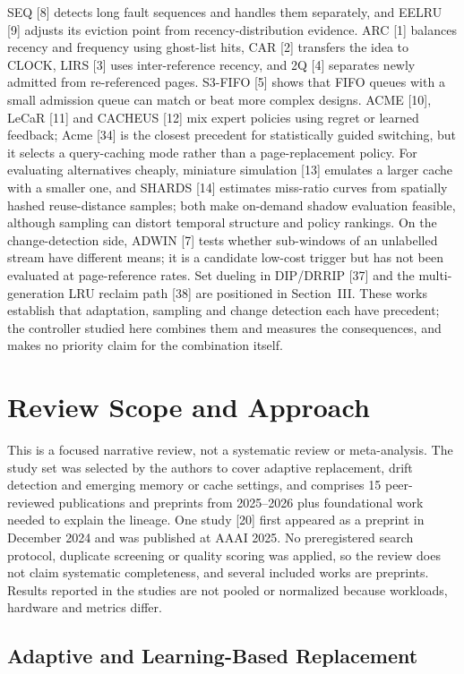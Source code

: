 \documentclass[10pt,twocolumn,a4paper]{IEEEtran}
\begin{document}
SEQ [8] detects long fault sequences and handles them separately, and EELRU
[9] adjusts its eviction point from recency-distribution evidence. ARC [1]
balances recency and frequency using ghost-list hits, CAR [2] transfers the
idea to CLOCK, LIRS [3] uses inter-reference recency, and 2Q [4] separates
newly admitted from re-referenced pages. S3-FIFO [5] shows that FIFO queues
with a small admission queue can match or beat more complex designs. ACME
[10], LeCaR [11] and CACHEUS [12] mix expert policies using regret or learned
feedback; Acme [34] is the closest precedent for statistically guided
switching, but it selects a query-caching mode rather than a page-replacement
policy. For evaluating alternatives cheaply, miniature simulation [13]
emulates a larger cache with a smaller one, and SHARDS [14] estimates
miss-ratio curves from spatially hashed reuse-distance samples; both make
on-demand shadow evaluation feasible, although sampling can distort temporal
structure and policy rankings. On the change-detection side, ADWIN [7] tests
whether sub-windows of an unlabelled stream have different means; it is a
candidate low-cost trigger but has not been evaluated at page-reference rates.
Set dueling in DIP/DRRIP [37] and the multi-generation LRU reclaim path [38]
are positioned in Section~III. These works establish that adaptation,
sampling and change detection each have precedent; the controller studied
here combines them and measures the consequences, and makes no priority claim
for the combination itself.

\section{Review Scope and Approach}
\label{sec:review}

This is a focused narrative review, not a systematic review or meta-analysis.
The study set was selected by the authors to cover adaptive replacement, drift
detection and emerging memory or cache settings, and comprises 15 peer-reviewed
publications and preprints from 2025--2026 plus foundational work needed to
explain the lineage. One study [20] first appeared as a preprint in December
2024 and was published at AAAI 2025. No preregistered search protocol,
duplicate screening or quality scoring was applied, so the review does not
claim systematic completeness, and several included works are preprints.
Results reported in the studies are not pooled or normalized because
workloads, hardware and metrics differ.

\subsection{Adaptive and Learning-Based Replacement}
\end{document}

